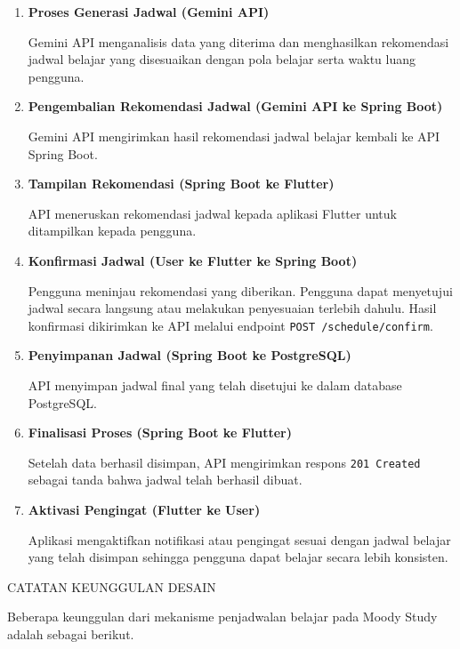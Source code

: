 \documentclass[11pt]{article}
\begin{document}
\begin{enumerate}
\item \textbf{Proses Generasi Jadwal (Gemini API)}

Gemini API menganalisis data yang diterima dan menghasilkan rekomendasi jadwal belajar yang disesuaikan dengan pola belajar serta waktu luang pengguna.

\item \textbf{Pengembalian Rekomendasi Jadwal (Gemini API ke Spring Boot)}

Gemini API mengirimkan hasil rekomendasi jadwal belajar kembali ke API Spring Boot.

\item \textbf{Tampilan Rekomendasi (Spring Boot ke Flutter)}

API meneruskan rekomendasi jadwal kepada aplikasi Flutter untuk ditampilkan kepada pengguna.

\item \textbf{Konfirmasi Jadwal (User ke Flutter ke Spring Boot)}

Pengguna meninjau rekomendasi yang diberikan. Pengguna dapat menyetujui jadwal secara langsung atau melakukan penyesuaian terlebih dahulu. Hasil konfirmasi dikirimkan ke API melalui endpoint \texttt{POST /schedule/confirm}.

\item \textbf{Penyimpanan Jadwal (Spring Boot ke PostgreSQL)}

API menyimpan jadwal final yang telah disetujui ke dalam database PostgreSQL.

\item \textbf{Finalisasi Proses (Spring Boot ke Flutter)}

Setelah data berhasil disimpan, API mengirimkan respons \texttt{201 Created} sebagai tanda bahwa jadwal telah berhasil dibuat.

\item \textbf{Aktivasi Pengingat (Flutter ke User)}

Aplikasi mengaktifkan notifikasi atau pengingat sesuai dengan jadwal belajar yang telah disimpan sehingga pengguna dapat belajar secara lebih konsisten.

\end{enumerate}

CATATAN KEUNGGULAN DESAIN

Beberapa keunggulan dari mekanisme penjadwalan belajar pada Moody Study adalah sebagai berikut.
\end{document}

